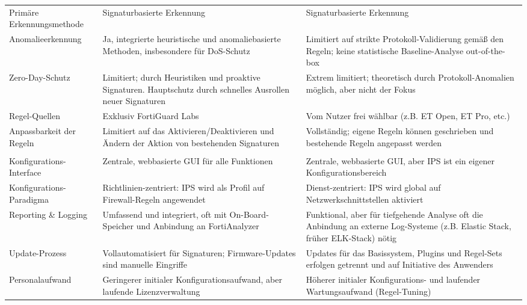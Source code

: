 \begin{longtable}{>{\RaggedRight}p{} >{\RaggedRight}p{} >{\RaggedRight}p{}}
	\multicolumn{3}{l}{\textbf{III. Erkennungsmethoden \& Intelligenz}} \\
	\midrule
	Primäre Erkennungsmethode & Signaturbasierte Erkennung & Signaturbasierte Erkennung \\
	\addlinespace
	Anomalieerkennung & Ja, integrierte heuristische und anomaliebasierte Methoden, insbesondere für DoS-Schutz & Limitiert auf strikte Protokoll-Validierung gemäß den Regeln; keine statistische Baseline-Analyse out-of-the-box \\
	\addlinespace
	Zero-Day-Schutz & Limitiert; durch Heuristiken und proaktive Signaturen. Hauptschutz durch schnelles Ausrollen neuer Signaturen & Extrem limitiert; theoretisch durch Protokoll-Anomalien möglich, aber nicht der Fokus \\
	\addlinespace
	Regel-Quellen & Exklusiv FortiGuard Labs & Vom Nutzer frei wählbar (z.B. ET Open, ET Pro, etc.) \\
	\addlinespace
	Anpassbarkeit der Regeln & Limitiert auf das Aktivieren/Deaktivieren und Ändern der Aktion von bestehenden Signaturen & Vollständig; eigene Regeln können geschrieben und bestehende Regeln angepasst werden \\
	\midrule
	
	\multicolumn{3}{l}{\textbf{IV. Verwaltung \& Betrieb}} \\
	\midrule
	Konfigurations-Interface & Zentrale, webbasierte GUI für alle Funktionen & Zentrale, webbasierte GUI, aber IPS ist ein eigener Konfigurationsbereich \\
	\addlinespace
	Konfigurations-Paradigma & Richtlinien-zentriert: IPS wird als Profil auf Firewall-Regeln angewendet & Dienst-zentriert: IPS wird global auf Netzwerkschnittstellen aktiviert \\
	\addlinespace
	Reporting \& Logging & Umfassend und integriert, oft mit On-Board-Speicher und Anbindung an FortiAnalyzer & Funktional, aber für tiefgehende Analyse oft die Anbindung an externe Log-Systeme (z.B. Elastic Stack, früher ELK-Stack) nötig \\
	\addlinespace
	Update-Prozess & Vollautomatisiert für Signaturen; Firmware-Updates sind manuelle Eingriffe & Updates für das Basissystem, Plugins und Regel-Sets erfolgen getrennt und auf Initiative des Anwenders \\
	\addlinespace
	Personalaufwand & Geringerer initialer Konfigurationsaufwand, aber laufende Lizenzverwaltung & Höherer initialer Konfigurations- und laufender Wartungsaufwand (Regel-Tuning) \\
	\midrule
	

\end{longtable}

